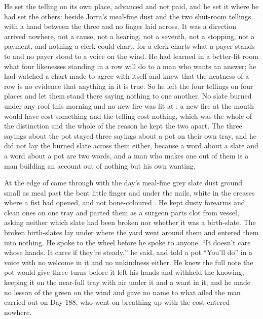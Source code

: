 He set the telling on its own place, advanced and not paid, and he set it where he had set the others: beside Jorra's meal-fine dust and the two shut-room tellings, with a hand between the three and no finger laid across. It was a direction arrived nowhere, not a cause, not a hearing, not a seventh, not a stopping, not a payment, and nothing a clerk could chart, for a clerk charts what a payer stands to and no payer stood to a voice on the wind. He had learned in a better-lit room what four likenesses standing in a row will do to a man who wants an answer; he had watched a chart made to agree with itself and knew that the neatness of a row is no evidence that anything in it is true. So he left the four tellings on four places and let them stand there saying nothing to one another. No slate burned under any roof this morning and no new fire was lit at ; a new fire at the mouth would have cost something and the telling cost nothing, which was the whole of the distinction and the whole of the reason he kept the two apart. The three sayings about the pot stayed three sayings about a pot on their own tray, and he did not lay the burned slate across them either, because a word about a slate and a word about a pot are two words, and a man who makes one out of them is a man building an account out of nothing but his own wanting.

\scenebreak

At the edge of   came through with the day's meal-fine grey slate dust ground small as meal past the bent little finger and under the nails, white in the creases where a fist had opened, and not bone-coloured . He kept dusty forearms and clean ones on one tray and parted them as a surgeon parts clot from vessel, asking neither which slate had been broken nor whether it was a birth-slate. The broken birth-slates lay under  where the yard went around them and entered them into nothing. He spoke to the wheel before he spoke to anyone. “It doesn't care whose hands. It cares if they're steady,” he said, and told a pot “You'll do” in a voice with no welcome in it and no unkindness either. He knew the full note the pot would give three turns before it left his hands and withheld the knowing, keeping it on the near-full tray with air under it and a want in it, and he made no lesson of the green on the wind and gave no name to what ailed the man carried out on Day 188, who went on breathing up  with the cost entered nowhere.

